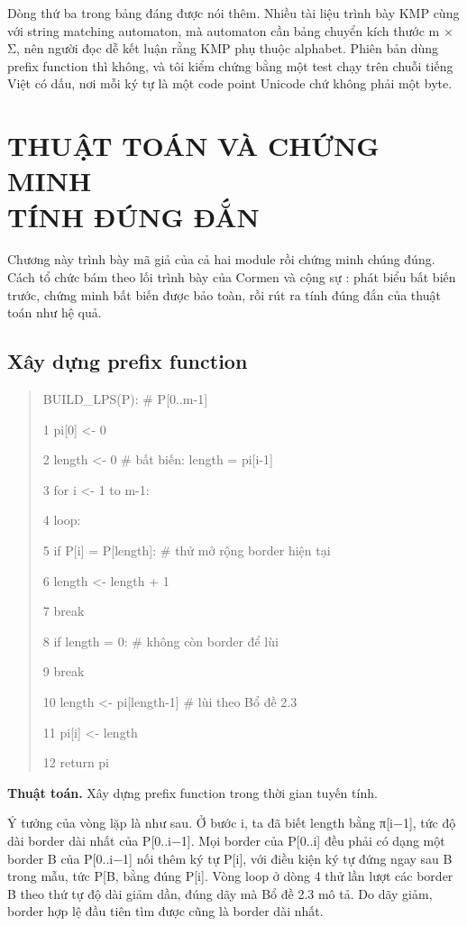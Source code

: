 Dòng thứ ba trong bảng đáng được nói thêm. Nhiều tài liệu trình bày KMP
cùng với string matching automaton, mà automaton cần bảng chuyển kích
thước m × \textbar Σ\textbar, nên người đọc dễ kết luận rằng KMP phụ
thuộc alphabet. Phiên bản dùng prefix function thì không, và tôi kiểm
chứng bằng một test chạy trên chuỗi tiếng Việt có dấu, nơi mỗi ký tự là
một code point Unicode chứ không phải một byte.

\chapter{THUẬT TOÁN VÀ CHỨNG MINH\\TÍNH ĐÚNG ĐẮN}
\label{ch:3}

Chương này trình bày mã giả của cả hai module rồi chứng minh chúng đúng.
Cách tổ chức bám theo lối trình bày của Cormen và cộng sự \cite{cormen2022}: phát
biểu bất biến trước, chứng minh bất biến được bảo toàn, rồi rút ra tính
đúng đắn của thuật toán như hệ quả.

\section{Xây dựng prefix function}
\label{sec:3-1}

\begin{quote}
BUILD\_LPS(P): \# P{[}0..m-1{]}

1 pi{[}0{]} \textless- 0

2 length \textless- 0 \# bất biến: length = pi{[}i-1{]}

3 for i \textless- 1 to m-1:

4 loop:

5 if P{[}i{]} = P{[}length{]}: \# thử mở rộng border hiện tại

6 length \textless- length + 1

7 break

8 if length = 0: \# không còn border để lùi

9 break

10 length \textless- pi{[}length-1{]} \# lùi theo Bổ đề 2.3

11 pi{[}i{]} \textless- length

12 return pi
\end{quote}

\begin{center}
\textbf{Thuật toán.} Xây dựng prefix function trong thời gian tuyến tính.
\end{center}

Ý tưởng của vòng lặp là như sau. Ở bước i, ta đã biết length bằng
π{[}i−1{]}, tức độ dài border dài nhất của P{[}0..i−1{]}. Mọi border của
P{[}0..i{]} đều phải có dạng một border B của P{[}0..i−1{]} nối thêm ký
tự P{[}i{]}, với điều kiện ký tự đứng ngay sau B trong mẫu, tức
P{[}\textbar B\textbar{]}, bằng đúng P{[}i{]}. Vòng loop ở dòng 4 thử
lần lượt các border B theo thứ tự độ dài giảm dần, đúng dãy mà Bổ đề 2.3
mô tả. Do dãy giảm, border hợp lệ đầu tiên tìm được cũng là border dài
nhất.

